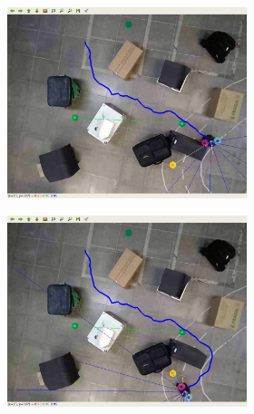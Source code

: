 \begin{figure}[H]
\begin{center}
\begin{subfigure}[b]{0.60\textwidth}
        \begin{subfigure}[b]{0.24\textwidth}
            \includegraphics[width=\textwidth]{imagens/real_envs/real_env2_ddpg/5.png}
        \end{subfigure}
        \hfill
        \begin{subfigure}[b]{0.24\textwidth}
            \includegraphics[width=\textwidth]{imagens/real_envs/real_env2_ddpg/6.png}
        \end{subfigure}
        \hfill
        \begin{subfigure}[b]{0.24\textwidth}

\end{subfigure}
\end{subfigure}
\end{center}
\end{figure}

